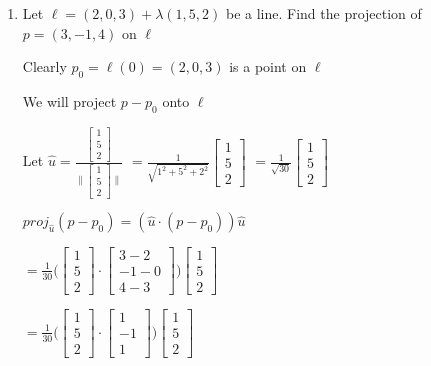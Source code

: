 \documentclass{article}
\begin{document}
    \begin{enumerate}
        \item Let $\ell=(2,0,3)+ \lambda(1,5,2)$ be a line. Find the projection of $p=(3,-1,4)$ on $\ell$

        Clearly $p_0 = \ell(0) = (2,0,3)$ is a point on $\ell$ 

        We will project $p - p_0$ onto $\ell$

        Let $\hat{u} = \frac{\begin{bmatrix} 1 \\ 5 \\ 2\end{bmatrix}}
        { \Bigg \| \begin{bmatrix} 1 \\ 5 \\ 2\end{bmatrix} \Bigg \| }$
        $ = \frac{1}{ \sqrt{1^2 + 5^2 + 2^2} }  \begin{bmatrix} 1 \\ 5 \\ 2 \end{bmatrix}$
        $ = \frac{1}{ \sqrt{30} }\begin{bmatrix} 1 \\ 5 \\ 2\end{bmatrix}$

        $proj_{\hat{u}}(p - p_0)= (\hat{u} \cdot (p - p_0)) \hat{u} $

        $= \frac{1}{30} \Bigg (\begin{bmatrix} 1 \\ 5 \\ 2\end{bmatrix} \cdot \begin{bmatrix} 3 - 2 \\ -1 - 0 \\ 4 - 3 \end{bmatrix} \Bigg )\begin{bmatrix} 1 \\ 5 \\ 2\end{bmatrix}$

        $= \frac{1}{30} \Bigg (\begin{bmatrix} 1 \\ 5 \\ 2\end{bmatrix} \cdot \begin{bmatrix} 1 \\ -1 \\ 1 \end{bmatrix} \Bigg )\begin{bmatrix} 1 \\ 5 \\ 2\end{bmatrix}$


\end{enumerate}
\end{document}
